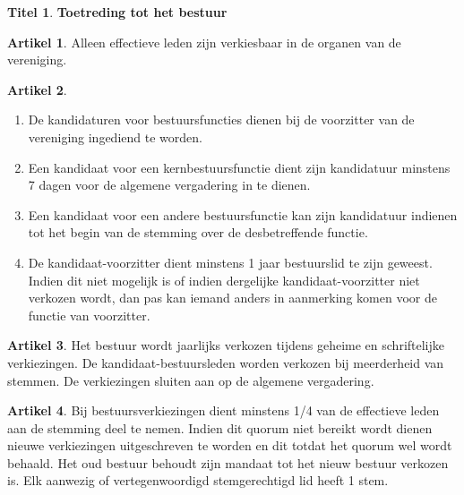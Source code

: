 \documentclass[a4paper,10pt]{article}
\theoremstyle{definition}
\newtheorem{titel}{\newline\Large Titel}
\newtheorem{artikelbase}{\large Artikel}
\newenvironment{artikel}
  {\begin{artikelbase}}
  {\smallskip
   \end{artikelbase}}
\newcommand{\ttext}[1]{\Large \textbf{#1} \normalsize}
\newcommand{\ttextcr}{\hfill\newline}
\newcommand{\ttextenum}{\mbox{}}
\begin{document}
\begin{titel}\ttext{Toetreding tot het bestuur}

  \begin{artikel}\ttextcr
    Alleen effectieve leden zijn verkiesbaar in de organen van de vereniging.
  \end{artikel}

  \begin{artikel}\ttextenum
    \begin{enumerate}
      \item
        De kandidaturen voor bestuursfuncties dienen bij de voorzitter van de vereniging ingediend te worden.
      \item
        Een kandidaat voor een kernbestuursfunctie dient zijn kandidatuur minstens 7 dagen voor de algemene vergadering in te dienen.
      \item
        Een kandidaat voor een andere bestuursfunctie kan zijn kandidatuur indienen tot het begin van de stemming over de desbetreffende functie.
      \item
        De kandidaat-voorzitter dient minstens 1 jaar bestuurslid te zijn geweest.
        Indien dit niet mogelijk is of indien dergelijke kandidaat-voorzitter niet verkozen wordt, dan pas kan iemand anders in aanmerking komen voor de functie van voorzitter.
    \end{enumerate}
  \end{artikel}

  \begin{artikel}\ttextcr
    Het bestuur wordt jaarlijks verkozen tijdens geheime en schriftelijke verkiezingen.
    De kandidaat-bestuursleden worden verkozen bij meerderheid van stemmen.
    De verkiezingen sluiten aan op de algemene vergadering.
  \end{artikel}

  \begin{artikel}\ttextcr
    Bij bestuursverkiezingen dient minstens 1/4 van de effectieve leden aan de stemming deel te nemen.
    Indien dit quorum niet bereikt wordt dienen nieuwe verkiezingen uitgeschreven te worden en dit totdat het quorum wel wordt behaald.
    Het oud bestuur behoudt zijn mandaat tot het nieuw bestuur verkozen is.
    Elk aanwezig of vertegenwoordigd stemgerechtigd lid heeft 1 stem.
  \end{artikel}


\end{titel}
\end{document}
